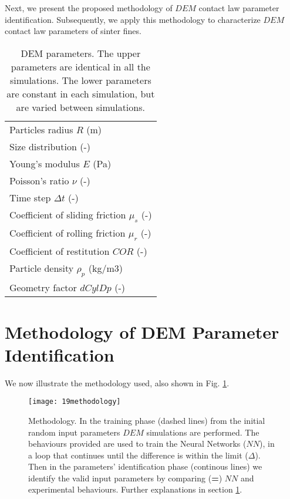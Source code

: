 \documentclass[review]{elsarticle}
\begin{document}
Next, we present the proposed methodology of $DEM$ contact law parameter identification. 
Subsequently, we apply this methodology to characterize $DEM$ contact law
parameters of sinter fines.
%
\begin{table}[h]
\centering
\begin{tabular}{l}
\hline 
     Particles radius $R$ (m)   \\ [5pt]

	Size distribution (-) \\ [5pt]

    Young's modulus $E$ (Pa)  \\ [5pt]

    Poisson's ratio $\nu$ (-) \\ 
     Time step $\Delta t$ (-) \\ [5pt]
        \hline
     Coefficient of sliding friction $\mu_s$ (-)\\  [5pt]
    Coefficient of rolling friction $\mu_r$ (-) \\ [5pt]
    Coefficient of restitution $COR$ (-)   \\ [5pt]
     Particle density $\rho_p$ (kg/m3)  \\ [5pt]
    Geometry factor $dCylDp$ (-)  \\ [5pt]
   
\hline
\end{tabular}
\caption[DEM parameters]{DEM parameters. The upper parameters are
identical in all the simulations. The lower parameters are constant in each
simulation, but are varied between simulations.}
\label{tab:08DEMparameters}
\end{table}

\section{Methodology of DEM Parameter Identification}
\label{sec:methodology}

We now illustrate the methodology used, also shown in Fig.
\ref{fig:19methodology}.
\begin{figure}[!htb] 
\centering 
\texttt{[image: 19methodology]} 
\caption[Methodology]{Methodology. 
In the training phase (dashed lines) from the initial random input parameters
$DEM$ simulations are performed. The behaviours provided are used to train the
Neural Networks ($NN$), in a loop that continues until the difference is within
the limit ($\Delta$).
Then in the parameters' identification phase (continous
lines) we identify the valid input parameters by comparing (\textbf{=}) $NN$ and
experimental behaviours.
Further explanations in section \ref{sec:methodology}.
}
\label{fig:19methodology} 
\end{figure}
\end{document}
